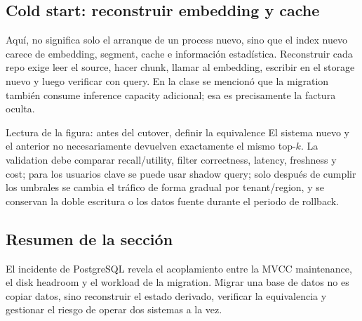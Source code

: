\subsection{Cold start: reconstruir embedding y cache}

Aquí,  no significa solo el arranque de un process nuevo, sino que el index nuevo carece de embedding, segment, cache e información estadística. Reconstruir cada repo exige leer el source, hacer chunk, llamar al embedding, escribir en el storage nuevo y luego verificar con query. En la clase se mencionó que la migration también consume inference capacity adicional; esa es precisamente la factura oculta.


\begin{knowledgebox}{Lectura de la figura: antes del cutover, definir la equivalence}
El sistema nuevo y el anterior no necesariamente devuelven exactamente el mismo top-$k$. La validation debe comparar recall/utility, filter correctness, latency, freshness y cost; para los usuarios clave se puede usar shadow query; solo después de cumplir los umbrales se cambia el tráfico de forma gradual por tenant/region, y se conservan la doble escritura o los datos fuente durante el periodo de rollback.
\end{knowledgebox}


\subsection{Resumen de la sección}

El incidente de PostgreSQL revela el acoplamiento entre la MVCC maintenance, el disk headroom y el workload de la migration. Migrar una base de datos no es copiar datos, sino reconstruir el estado derivado, verificar la equivalencia y gestionar el riesgo de operar dos sistemas a la vez.
